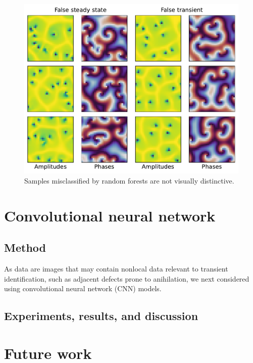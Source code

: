 \documentclass[nofootinbib,pre,superscriptaddress,twocolumn,longbibliography,floatfix]{revtex4-2}
\begin{document}
\begin{figure}[h]
    \centering
    \includegraphics[width=1.0\linewidth]{../figures/rf_misclassified.pdf}
    \caption{Samples misclassified by random forests are not visually distinctive.}
    \label{fig:rf_misclassified}
\end{figure}

\section{Convolutional neural network}
\subsection{Method}
As data are images that may contain nonlocal data relevant to transient identification,
such as adjacent defects prone to anihilation,
we next considered using convolutional neural network (CNN) models.


\subsection{Experiments, results, and discussion}

\section{Future work}


\end{document}
